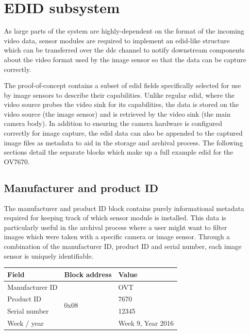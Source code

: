 \section{EDID subsystem}
\label{sec:edid}

As large parts of the system are highly-dependent on the format of the incoming video data, sensor modules are required to implement an \gls{edid}-like structure which can be transferred over the \gls{ddc} channel to notify downstream components about the video format used by the image sensor so that the data can be capture correctly.

The proof-of-concept contains a subset of \gls{edid} fields specifically selected for use by image sensors to describe their capabilities. Unlike regular \gls{edid}, where the video source probes the video sink for its capabilities, the data is stored on the video source (the image sensor) and is retrieved by the video sink (the main camera body). In addition to ensuring the camera hardware is configured correctly for image capture, the \gls{edid} data can also be appended to the captured image files as metadata to aid in the storage and archival process. The following sections detail the separate blocks which make up a full example \gls{edid} for the OV7670.

\subsection{Manufacturer and product ID}
The manufacturer and product ID block contains purely informational metadata required for keeping track of which sensor module is installed. This data is particularly useful in the archival process where a user might want to filter images which were taken with a specific camera or image sensor. Through a combination of the manufacturer ID, product ID and serial number, each image sensor is uniquely identifiable.  

\begin{table}[h]
    \begin{tabular}{lll}
        Field               & Block address             & Value             \\
        \hline
        Manufacturer ID     & \multirow{5}{*}{0x08}     & OVT               \\
        Product ID          &                           & 7670              \\
        Serial number       &                           & 12345             \\
        Week / year         &                           & Week 9, Year 2016 \\
    \end{tabular}
\end{table}

